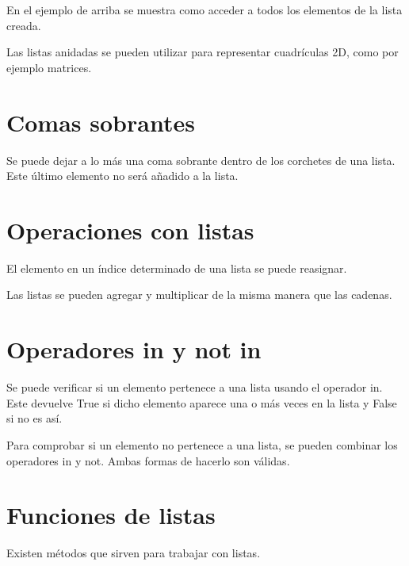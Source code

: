 \documentclass{report}
\begin{document}

En el ejemplo de arriba se muestra como acceder a todos los elementos de la lista creada.

Las listas anidadas se pueden utilizar para representar cuadrículas 2D, como por ejemplo matrices.


\section{Comas sobrantes}

Se puede dejar a lo más una coma sobrante dentro de los corchetes de una lista. Este último elemento no será añadido a la lista.


\section{Operaciones con listas}

El elemento en un índice determinado de una lista se puede reasignar.


Las listas se pueden agregar y multiplicar de la misma manera que las cadenas.


\section{Operadores in y not in}

Se puede verificar si un elemento pertenece a una lista usando el operador in. Este devuelve True si dicho elemento aparece una o más veces en la lista y False si no es así.


Para comprobar si un elemento no pertenece a una lista, se pueden combinar los operadores in y not. Ambas formas de hacerlo son válidas.


\section{Funciones de listas}

Existen métodos que sirven para trabajar con listas.
\end{document}
